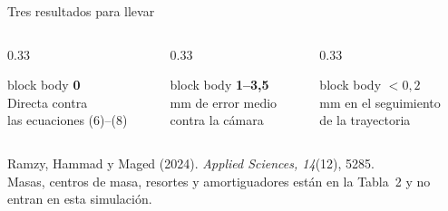 \documentclass[aspectratio=169,11pt]{beamer}
\begin{document}
\begin{frame}{Tres resultados para llevar}
\vspace{0.4em}
\begin{columns}[c]
\begin{column}{0.33\textwidth}
\begin{beamercolorbox}[wd=\linewidth,sep=0.7em,center]{block body}
{\LARGE\bfseries\color{unirojo} 0}\\[0.3em]
{\small Directa contra\\las ecuaciones (6)--(8)}
\end{beamercolorbox}
\end{column}
\begin{column}{0.33\textwidth}
\begin{beamercolorbox}[wd=\linewidth,sep=0.7em,center]{block body}
{\LARGE\bfseries\color{unirojo} 1--3,5}\\[0.3em]
{\small mm de error medio\\contra la cámara}
\end{beamercolorbox}
\end{column}
\begin{column}{0.33\textwidth}
\begin{beamercolorbox}[wd=\linewidth,sep=0.7em,center]{block body}
{\LARGE\bfseries\color{unirojo} \(<0{,}2\)}\\[0.3em]
{\small mm en el seguimiento\\de la trayectoria}
\end{beamercolorbox}
\end{column}
\end{columns}
\vspace{1.1em}
{\small Ramzy, Hammad y Maged (2024). \emph{Applied Sciences, 14}(12), 5285.}\\[0.35em]
{\small Masas, centros de masa, resortes y amortiguadores están en la Tabla~2 y no entran en esta simulación.}
\end{frame}
\end{document}
